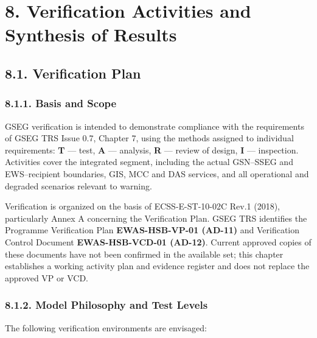 \section{8. Verification Activities and Synthesis of Results}\label{ddjf-8}

\subsection{8.1. Verification Plan}\label{ddjf-8-1}

\subsubsection{8.1.1. Basis and Scope}\label{ddjf-8-1-1}

GSEG verification is intended to demonstrate compliance with the requirements of GSEG TRS Issue 0.7, Chapter 7, using the methods assigned to individual requirements: \textbf{T} — test, \textbf{A} — analysis, \textbf{R} — review of design, \textbf{I} — inspection. Activities cover the integrated segment, including the actual GSN–SSEG and EWS–recipient boundaries, GIS, MCC and DAS services, and all operational and degraded scenarios relevant to warning.

Verification is organized on the basis of ECSS-E-ST-10-02C Rev.1 (2018), particularly Annex A concerning the Verification Plan. GSEG TRS identifies the Programme Verification Plan \textbf{EWAS-HSB-VP-01 (AD-11)} and Verification Control Document \textbf{EWAS-HSB-VCD-01 (AD-12)}. Current approved copies of these documents have not been confirmed in the available set; this chapter establishes a working activity plan and evidence register and does not replace the approved VP or VCD.

\subsubsection{8.1.2. Model Philosophy and Test Levels}\label{ddjf-8-1-2}

The following verification environments are envisaged:

